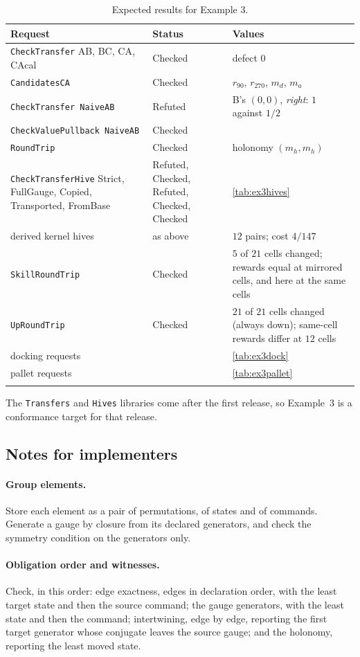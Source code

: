 \documentclass[11pt]{article}
\newcommand{\code}[1]{\texttt{#1}}
\theoremstyle{definition}
\theoremstyle{plain}
\begin{document}
\begin{longtable}{>{\raggedright\arraybackslash}p{5.0cm}>{\raggedright\arraybackslash}p{3.2cm}>{\raggedright\arraybackslash}p{5.6cm}}
\toprule
Request & Status & Values\\
\midrule
\endhead
\code{CheckTransfer} AB, BC, CA, CAcal & Checked & defect $0$\\
\code{CandidatesCA} & Checked & $r_{90}$, $r_{270}$, $m_d$, $m_a$\\
\code{CheckTransfer NaiveAB} & Refuted & B's $(0,0)$, \emph{right}: $1$ against $1/2$\\
\code{CheckValuePullback NaiveAB} & Checked & \\
\code{RoundTrip} & Checked & holonomy $(m_h,m_h)$\\
\code{CheckTransferHive} Strict, FullGauge, Copied, Transported, FromBase & Refuted, Checked, Refuted, Checked, Checked & \cref{tab:ex3hives}\\
derived kernel hives & as above & $12$ pairs; cost $4/147$\\
\code{SkillRoundTrip} & Checked & $5$ of $21$ cells changed; rewards equal at mirrored cells, and here at the same cells\\
\code{UpRoundTrip} & Checked & $21$ of $21$ cells changed (always down); same-cell rewards differ at $12$ cells\\
docking requests & & \cref{tab:ex3dock}\\
pallet requests & & \cref{tab:ex3pallet}\\
\bottomrule
\caption{Expected results for Example 3.}\label{tab:ex3results}
\end{longtable}

The \code{Transfers} and \code{Hives} libraries come after the first release, so Example~3 is a
conformance target for that release.

\subsection{Notes for implementers}

\paragraph{Group elements.} Store each element as a pair of permutations, of states and of commands.
Generate a gauge by closure from its declared generators, and check the symmetry condition on the
generators only.

\paragraph{Obligation order and witnesses.} Check, in this order: edge exactness, edges in
declaration order, with the least target state and then the source command; the gauge generators,
with the least state and then the command; intertwining, edge by edge, reporting the first target
generator whose conjugate leaves the source gauge; and the holonomy, reporting the least moved state.
\end{document}

